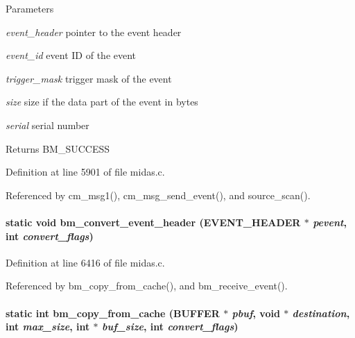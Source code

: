 \begin{DoxyParams}{Parameters}
\item[{\em event\_\-header}]pointer to the event header \item[{\em event\_\-id}]event ID of the event \item[{\em trigger\_\-mask}]trigger mask of the event \item[{\em size}]size if the data part of the event in bytes \item[{\em serial}]serial number \end{DoxyParams}
\begin{DoxyReturn}{Returns}
BM\_\-SUCCESS 
\end{DoxyReturn}


Definition at line 5901 of file midas.c.

Referenced by cm\_\-msg1(), cm\_\-msg\_\-send\_\-event(), and source\_\-scan().
\paragraph[{bm\_\-convert\_\-event\_\-header}]{\setlength{\rightskip}{0pt plus 5cm}static void bm\_\-convert\_\-event\_\-header ({\bf EVENT\_\-HEADER} $\ast$ {\em pevent}, \/  int {\em convert\_\-flags})}\hfill\label{group__bmfunctionc_ga59590af56aeabd24fce9112ca32ffecf}


Definition at line 6416 of file midas.c.

Referenced by bm\_\-copy\_\-from\_\-cache(), and bm\_\-receive\_\-event().
\paragraph[{bm\_\-copy\_\-from\_\-cache}]{\setlength{\rightskip}{0pt plus 5cm}static int bm\_\-copy\_\-from\_\-cache ({\bf BUFFER} $\ast$ {\em pbuf}, \/  void $\ast$ {\em destination}, \/  int {\em max\_\-size}, \/  int $\ast$ {\em buf\_\-size}, \/  int {\em convert\_\-flags})}\hfill\label{group__bmfunctionc_ga3c7b7fc1483b9cdcb5ee4a6baef102e2}


